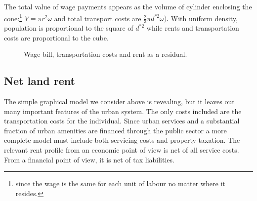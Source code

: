 The total value of wage payments appears as the volume of cylinder enclosing the cone:\footnote{since the wage is the same for each unit of labour no matter where it resides.}  
$V=\pi r^2 \omega$ 
and total transport costs are 
$\frac{2}{3}\pi  d^{*2} \omega).$
With uniform density, population is proportional to the square of  $d^{*2}$ while rents and  transportation costs are proportional to the cube. %

\begin{figure}
    \begin{center}
    
    \caption{Wage bill, transportation costs and rent as a residual.}
    \label{fig-city-conical}
    \end{center}
\end{figure}



\subsection{Net land rent} 
The simple graphical model we consider above is revealing, but it leaves out many important features of the urban system. The only costs included are the transportation costs for the individual.  Since urban services and  a substantial fraction of urban amenities are financed through the public sector a more complete model must include both servicing costs and property taxation. The relevant rent profile from an economic point of view is net of all service costs. From a financial point of view, it is net of tax liabilities.%

